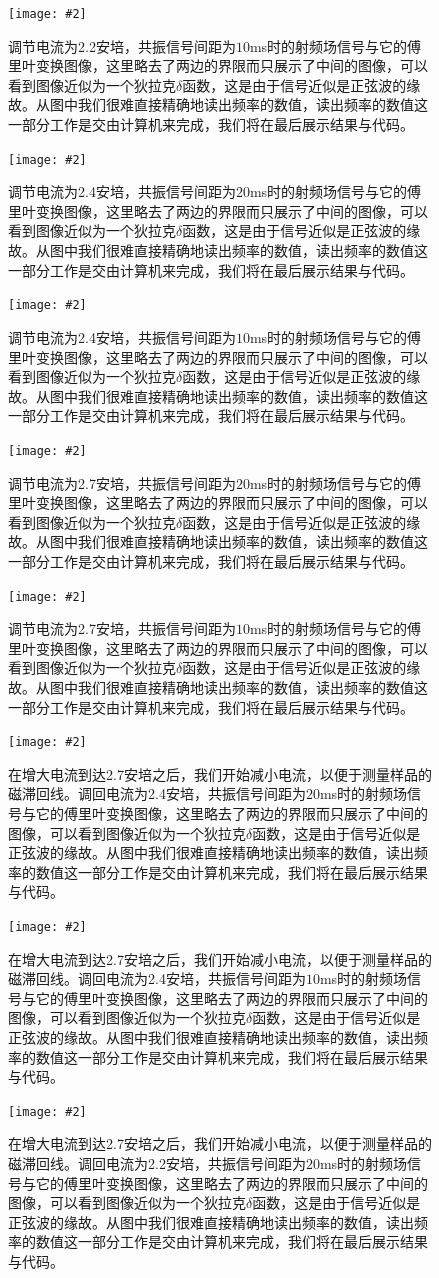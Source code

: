 \documentclass{ctexart}
\newcommand{\cpic}[2]{
\begin{center}
\texttt{[image: \#2]}
\end{center}
}
\newcommand{\cpicn}[3]
{
\begin{figure}[H]
\cpic{#1}{#2}
\caption{#3\label{#2}}
\end{figure}
}
\begin{document}
\cpicn{0.5}{22_2}{调节电流为2.2安培，共振信号间距为$10$ms时的射频场信号与它的傅里叶变换图像，这里略去了两边的界限而只展示了中间的图像，可以看到图像近似为一个狄拉克$\delta$函数，这是由于信号近似是正弦波的缘故。从图中我们很难直接精确地读出频率的数值，读出频率的数值这一部分工作是交由计算机来完成，我们将在最后展示结果与代码。}
\cpicn{0.5}{24_1}{调节电流为2.4安培，共振信号间距为$20$ms时的射频场信号与它的傅里叶变换图像，这里略去了两边的界限而只展示了中间的图像，可以看到图像近似为一个狄拉克$\delta$函数，这是由于信号近似是正弦波的缘故。从图中我们很难直接精确地读出频率的数值，读出频率的数值这一部分工作是交由计算机来完成，我们将在最后展示结果与代码。}
\cpicn{0.5}{24_2}{调节电流为2.4安培，共振信号间距为$10$ms时的射频场信号与它的傅里叶变换图像，这里略去了两边的界限而只展示了中间的图像，可以看到图像近似为一个狄拉克$\delta$函数，这是由于信号近似是正弦波的缘故。从图中我们很难直接精确地读出频率的数值，读出频率的数值这一部分工作是交由计算机来完成，我们将在最后展示结果与代码。}
\cpicn{0.5}{27_1}{调节电流为2.7安培，共振信号间距为$20$ms时的射频场信号与它的傅里叶变换图像，这里略去了两边的界限而只展示了中间的图像，可以看到图像近似为一个狄拉克$\delta$函数，这是由于信号近似是正弦波的缘故。从图中我们很难直接精确地读出频率的数值，读出频率的数值这一部分工作是交由计算机来完成，我们将在最后展示结果与代码。}
\cpicn{0.5}{27_2}{调节电流为2.7安培，共振信号间距为$10$ms时的射频场信号与它的傅里叶变换图像，这里略去了两边的界限而只展示了中间的图像，可以看到图像近似为一个狄拉克$\delta$函数，这是由于信号近似是正弦波的缘故。从图中我们很难直接精确地读出频率的数值，读出频率的数值这一部分工作是交由计算机来完成，我们将在最后展示结果与代码。}
\cpicn{0.5}{24_1b}{在增大电流到达2.7安培之后，我们开始减小电流，以便于测量样品的磁滞回线。调回电流为2.4安培，共振信号间距为$20$ms时的射频场信号与它的傅里叶变换图像，这里略去了两边的界限而只展示了中间的图像，可以看到图像近似为一个狄拉克$\delta$函数，这是由于信号近似是正弦波的缘故。从图中我们很难直接精确地读出频率的数值，读出频率的数值这一部分工作是交由计算机来完成，我们将在最后展示结果与代码。}
\cpicn{0.5}{24_2b}{在增大电流到达2.7安培之后，我们开始减小电流，以便于测量样品的磁滞回线。调回电流为2.4安培，共振信号间距为$10$ms时的射频场信号与它的傅里叶变换图像，这里略去了两边的界限而只展示了中间的图像，可以看到图像近似为一个狄拉克$\delta$函数，这是由于信号近似是正弦波的缘故。从图中我们很难直接精确地读出频率的数值，读出频率的数值这一部分工作是交由计算机来完成，我们将在最后展示结果与代码。}
\cpicn{0.5}{22_1b}{在增大电流到达2.7安培之后，我们开始减小电流，以便于测量样品的磁滞回线。调回电流为2.2安培，共振信号间距为$20$ms时的射频场信号与它的傅里叶变换图像，这里略去了两边的界限而只展示了中间的图像，可以看到图像近似为一个狄拉克$\delta$函数，这是由于信号近似是正弦波的缘故。从图中我们很难直接精确地读出频率的数值，读出频率的数值这一部分工作是交由计算机来完成，我们将在最后展示结果与代码。}
\end{document}
